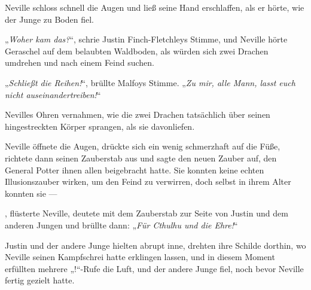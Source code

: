 Neville schloss schnell die Augen und ließ seine Hand erschlaffen, als er hörte, wie der Junge zu Boden fiel.

„\emph{Woher kam das?}“, schrie Justin Finch-Fletchleys Stimme, und Neville hörte Geraschel auf dem belaubten Waldboden, als würden sich zwei Drachen umdrehen und nach einem Feind suchen.

„\emph{Schließt die Reihen!}“, brüllte Malfoys Stimme.
„\emph{Zu mir, alle Mann, lasst euch nicht auseinandertreiben!}“

Nevilles Ohren vernahmen, wie die zwei Drachen tatsächlich über seinen hingestreckten Körper sprangen, als sie davonliefen.

Neville öffnete die Augen, drückte sich ein wenig schmerzhaft auf die Füße, richtete dann seinen Zauberstab aus und sagte den neuen Zauber auf, den General Potter ihnen allen beigebracht hatte. Sie konnten keine echten Illusionszauber wirken, um den Feind zu verwirren, doch selbst in ihrem Alter konnten sie —

,%
flüsterte Neville, deutete mit dem Zauberstab zur Seite von Justin und dem anderen Jungen und brüllte dann:
„\emph{Für Cthulhu und die Ehre!}“

Justin und der andere Junge hielten abrupt inne, drehten ihre Schilde dorthin, wo Neville seinen Kampfschrei hatte erklingen lassen, und in diesem Moment erfüllten mehrere „!“-Rufe die Luft, und der andere Junge fiel, noch bevor Neville fertig gezielt hatte.

